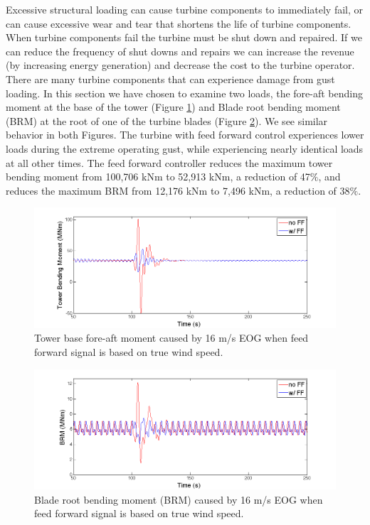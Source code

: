 Excessive structural loading can cause turbine components to immediately fail, or can cause excessive wear and tear that shortens the life of turbine components. When turbine components fail the turbine must be shut down and repaired. If we can reduce the frequency of shut downs and repairs we can increase the revenue (by increasing energy generation) and decrease the cost to the turbine operator. There are many turbine components that can experience damage from gust loading. In this section we have chosen to examine two loads, the fore-aft bending moment at the base of the tower (Figure \ref{fig3-16}) and Blade root bending moment (BRM) at the root of one of the turbine blades (Figure \ref{fig3-17}). We see similar behavior in both Figures. The turbine with feed forward control experiences lower loads during the extreme operating gust, while experiencing nearly identical loads at all other times. The feed forward controller reduces the maximum tower bending moment from 100,706 kNm to 52,913 kNm, a reduction of 47$\%$, and reduces the maximum BRM from 12,176 kNm to 7,496 kNm, a reduction of 38$\%$.

\begin{figure}[htb]
	\centering
		\includegraphics[width = \linewidth]{Figures/ch3Figures/fig3-16.png}
	\caption{Tower base fore-aft moment caused by 16 m/s EOG when feed forward signal is based on true wind speed.}
	\label{fig3-16}
\end{figure}

\begin{figure}[htb]
	\centering
		\includegraphics[width = \linewidth]{Figures/ch3Figures/fig3-17.png}
	\caption{Blade root bending moment (BRM) caused by 16 m/s EOG when feed forward signal is based on true wind speed.}
	\label{fig3-17}
\end{figure}


